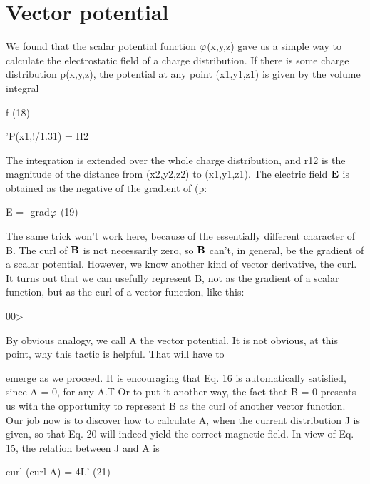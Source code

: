 \iffalse

\section{Vector potential}

We found that the scalar potential function $\varphi$(x,y,z) gave us a
simple way to calculate the electrostatic field of a charge distribution.
If there is some charge distribution p(x,y,z), the potential at any
point (x1,y1,z1) is given by the volume integral

\begin{equation}
\end{equation}
f  (18)

'P(x1,!/1.31) = H2

The integration is extended over the whole charge distribution, and
r12 is the magnitude of the distance from (x2,y2,z2) to (x1,y1,z1). The
electric field $\mathbf{E}$ is obtained as the negative of the gradient of (p:

\begin{equation}
\end{equation}
E = -grad$\varphi$ (19)

The same trick won't work here, because of the essentially different
character of B. The curl of $\mathbf{B}$ is not necessarily zero, so $\mathbf{B}$ can't, in
general, be the gradient of a scalar potential. However, we know
another kind of vector derivative, the curl. It turns out that we can
usefully represent B, not as the gradient of a scalar function, but as
the curl of a vector function, like this:

\begin{equation}
\end{equation}
00>

By obvious analogy, we call A the vector potential. It is not
obvious, at this point, why this tactic is helpful. That will have to


 

emerge as we proceed. It is encouraging that Eq. 16 is automatically
satisfied, since \div \curl A = 0, for any A.T Or to put it another way,
the fact that \div B = 0 presents us with the opportunity to represent
B as the curl of another vector function. Our job now is to discover
how to calculate A, when the current distribution J is given, so that
Eq. 20 will indeed yield the correct magnetic field. In view of Eq. 15,
the relation between J and A is

\begin{equation}
\end{equation}
curl (curl A) = 4L' (21)


